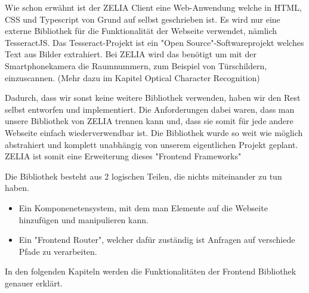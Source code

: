 
Wie schon erwähnt ist der ZELIA Client eine Web-Anwendung welche in HTML, CSS und Typescript von Grund auf selbst geschrieben ist. Es wird nur eine externe Bibliothek für die Funktionalität der Webseite verwendet, nämlich TesseractJS. Das Tesseract-Projekt ist ein "Open Source"-Softwareprojekt welches Text aus Bilder extrahiert. Bei ZELIA wird das benötigt um mit der Smartphonekamera die Raumnummern, zum Beispiel von Türschildern, einzuscannen. (Mehr dazu im Kapitel Optical Character Recognition)

Dadurch, dass wir sonst keine weitere Bibliothek verwenden, haben wir den Rest selbst entworfen und implementiert. Die Anforderungen dabei waren, dass man unsere Bibliothek von ZELIA trennen kann und, dass sie somit für jede andere Webseite einfach wiederverwendbar ist. Die Bibliothek wurde so weit wie möglich abstrahiert und komplett unabhängig von unserem eigentlichen Projekt geplant. ZELIA ist somit eine Erweiterung dieses "Frontend Frameworks"

Die Bibliothek besteht aus 2 logischen Teilen, die nichts miteinander zu tun haben. 
\begin{itemize}
    \item Ein Komponenetensystem, mit dem man Elemente auf die Webseite hinzufügen und manipulieren kann. 
    \item Ein "Frontend Router", welcher dafür zuständig ist Anfragen auf verschiede Pfade zu verarbeiten.
\end{itemize}

In den folgenden Kapiteln werden die Funktionalitäten der Frontend Bibliothek genauer erklärt.